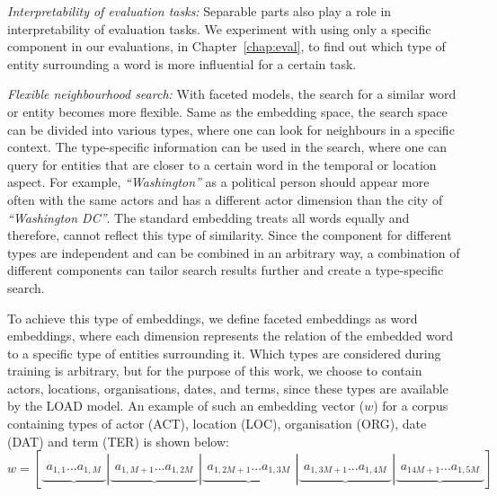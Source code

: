 \begin{compactitem}
\item \emph{Interpretability of evaluation tasks:} Separable parts also play a role in interpretability of evaluation tasks. We experiment with using only a specific component in our evaluations, in Chapter~\ref{chap:eval}, to find out which type of entity surrounding a word is more influential for a certain task.\\

\item \emph{Flexible neighbourhood search:} With faceted models, the search for a similar word or entity becomes more flexible. Same as the embedding space, the search space can be divided into various types, where one can look for neighbours in a specific context. The type-specific information can be used in the search, where one can query for entities that are closer to a certain word in the temporal or location aspect. For example, \emph{``Washington''} as a political person should appear more often with the same actors and has a different actor dimension than the city of \emph{``Washington DC''}. The standard embedding treats all words equally and therefore, cannot reflect this type of similarity. Since the component for different types are independent and can be combined in an arbitrary way, a combination of different components can tailor search results further and create a type-specific search. 
\end{compactitem}
To achieve this type of embeddings, we define faceted embeddings as word embeddings, where each dimension represents the relation of the embedded word to a specific type of entities surrounding it. Which types are considered during training is arbitrary, but for the purpose of this work, we choose to contain actors, locations, organisations, dates, and terms, since these types are available by the LOAD model. An example of such an embedding vector ($w$) for a corpus containing types of actor (ACT), location (LOC), organisation (ORG), date (DAT) and term (TER) is shown below: \\
\mathleft
\begin{equation}
w=\left[ \underbrace { \begin{matrix}{ a }_{ 1,1 } ... { a }_{ 1,M } \end{matrix} } |\underbrace { \begin{matrix}{ a }_{ 1,M+1 } ... { a }_{ 1,2M } \end{matrix} } |\underbrace { \begin{matrix}{ a }_{ 1,2M+1 } ... { a }_{ 1,3M } \end{matrix} } |\underbrace { \begin{matrix}{ a }_{ 1,3M+1 } ... { a }_{ 1,4M } \end{matrix} } |\underbrace { \begin{matrix}{ a }_{ 14M+1 } ... { a }_{ 1,5M } \end{matrix} }  \right] 
\label{eq:concat_vec}
\end{equation}
